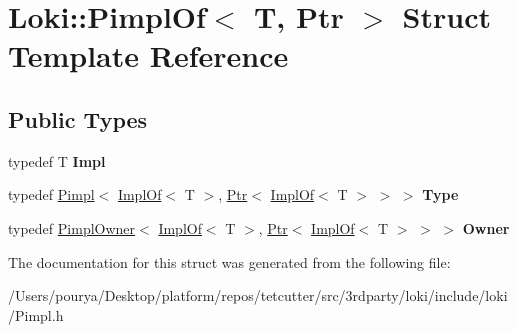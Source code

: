 \hypertarget{structLoki_1_1PimplOf}{}\section{Loki\+:\+:Pimpl\+Of$<$ T, Ptr $>$ Struct Template Reference}
\label{structLoki_1_1PimplOf}
\subsection*{Public Types}
\begin{DoxyCompactItemize}
\item 
\hypertarget{structLoki_1_1PimplOf_a1a30320b16ff75e3a5c58e5ad4cc01f2}{}typedef T {\bfseries Impl}\label{structLoki_1_1PimplOf_a1a30320b16ff75e3a5c58e5ad4cc01f2}

\item 
\hypertarget{structLoki_1_1PimplOf_a54ac6e87a670312e96e49afea293c601}{}typedef \hyperlink{classLoki_1_1Pimpl}{Pimpl}$<$ \hyperlink{structLoki_1_1ImplOf}{Impl\+Of}$<$ T $>$, \hyperlink{classLoki_1_1SmartPtr}{Ptr}$<$ \hyperlink{structLoki_1_1ImplOf}{Impl\+Of}$<$ T $>$ $>$ $>$ {\bfseries Type}\label{structLoki_1_1PimplOf_a54ac6e87a670312e96e49afea293c601}

\item 
\hypertarget{structLoki_1_1PimplOf_ac30a18008674c38b70d148834ce5bc7c}{}typedef \hyperlink{structLoki_1_1PimplOwner}{Pimpl\+Owner}$<$ \hyperlink{structLoki_1_1ImplOf}{Impl\+Of}$<$ T $>$, \hyperlink{classLoki_1_1SmartPtr}{Ptr}$<$ \hyperlink{structLoki_1_1ImplOf}{Impl\+Of}$<$ T $>$ $>$ $>$ {\bfseries Owner}\label{structLoki_1_1PimplOf_ac30a18008674c38b70d148834ce5bc7c}

\end{DoxyCompactItemize}


The documentation for this struct was generated from the following file\+:\begin{DoxyCompactItemize}
\item 
/\+Users/pourya/\+Desktop/platform/repos/tetcutter/src/3rdparty/loki/include/loki/Pimpl.\+h\end{DoxyCompactItemize}
